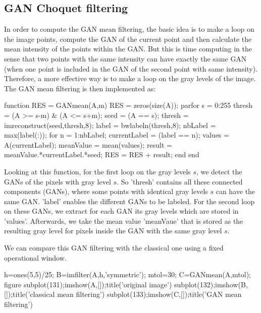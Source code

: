 \subsection{GAN Choquet filtering}
In order to compute the GAN mean filtering, the basic idea is to make a loop on the image points, compute the GAN of the current point and then calculate the mean intensity of the points within the GAN. But this is time computing in the sense that two points with the same intensity can have exactly the same GAN (when one point is included in the GAN of the second point with same intensity). Therefore, a more effective way is to make a loop on the gray levels of the image.
The GAN mean filtering is then implemented as:

\begin{matlab}
function RES = GANmean(A,m)
RES = zeros(size(A));
parfor s = 0:255
    thresh = (A >= s-m) & (A <= s+m);
    seed = (A == s);
    thresh = imreconstruct(seed,thresh,8);
    label = bwlabeln(thresh,8);
    nbLabel = max(label(:));
    for n = 1:nbLabel;
        currentLabel = (label == n);
        values = A(currentLabel);
        meanValue = mean(values);
        result = meanValue.*currentLabel.*seed;
        RES = RES + result;
    end
end
\end{matlab}

\noindent Looking at this function, for the first loop on the gray levels $s$, we detect the GANs of the pixels with gray level $s$. So 'thresh' contains all these connected components (GANs), where some points with identical gray levels $s$ can have the same GAN. 'label' enables the different GANs to be labeled. For the second loop on these GANs, we extract for each GAN its gray levels which are stored in 'values'. Afterwards, we take the mean value 'meanVaue'  that is stored as the resulting gray level for pixels inside the GAN with the same gray level $s$.

We can compare this GAN filtering with the classical one using a fixed operational window.

\begin{matlab}
h=ones(5,5)/25;
B=imfilter(A,h,'symmetric');
mtol=30;
C=GANmean(A,mtol);
figure
subplot(131);imshow(A,[]);title('original image')
subplot(132);imshow(B,[]);title('classical mean filtering')
subplot(133);imshow(C,[]);title('GAN mean filtering')
\end{matlab}

